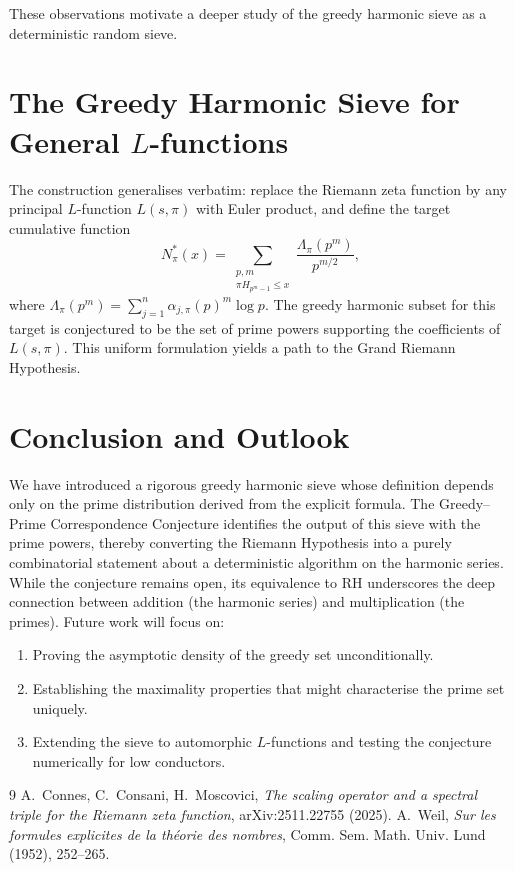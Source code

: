 \documentclass[12pt,a4paper,twoside,openright]{book}
\begin{document}
These observations motivate a deeper study of the greedy harmonic sieve as a deterministic random sieve.

\section{The Greedy Harmonic Sieve for General \(L\)-functions}

The construction generalises verbatim: replace the Riemann zeta function by any principal \(L\)-function \(L(s,\pi)\) with Euler product, and define the target cumulative function
\[
N_{\pi}^*(x) = \sum_{\substack{p,m\\ \pi H_{p^m-1} \le x}} \frac{\Lambda_\pi(p^m)}{p^{m/2}},
\]
where \(\Lambda_\pi(p^m) = \sum_{j=1}^n \alpha_{j,\pi}(p)^m \log p\).  The greedy harmonic subset for this target is conjectured to be the set of prime powers supporting the coefficients of \(L(s,\pi)\).  This uniform formulation yields a path to the Grand Riemann Hypothesis.

\section{Conclusion and Outlook}

We have introduced a rigorous greedy harmonic sieve whose definition depends only on the prime distribution derived from the explicit formula.  The Greedy--Prime Correspondence Conjecture identifies the output of this sieve with the prime powers, thereby converting the Riemann Hypothesis into a purely combinatorial statement about a deterministic algorithm on the harmonic series.  While the conjecture remains open, its equivalence to RH underscores the deep connection between addition (the harmonic series) and multiplication (the primes).  Future work will focus on:
\begin{enumerate}
\item Proving the asymptotic density of the greedy set unconditionally.
\item Establishing the maximality properties that might characterise the prime set uniquely.
\item Extending the sieve to automorphic \(L\)-functions and testing the conjecture numerically for low conductors.
\end{enumerate}


\begin{thebibliography}{9}
 A.~Connes, C.~Consani, H.~Moscovici, \emph{The scaling operator and a spectral triple for the Riemann zeta function}, arXiv:2511.22755 (2025).
 A.~Weil, \emph{Sur les formules explicites de la th\'eorie des nombres}, Comm. Sem. Math. Univ. Lund (1952), 252--265.
\end{thebibliography}
\end{document}
